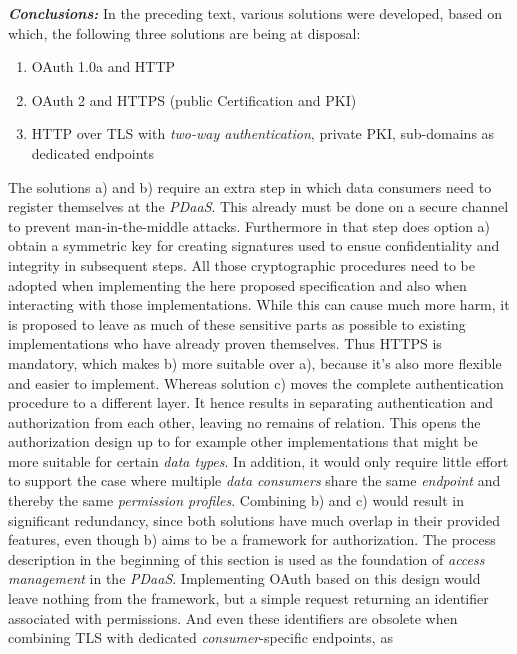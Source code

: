 \documentclass[12pt,english,a4paper,titlepage,cleardoublepage=empty,dottedtoc]{report}
\providecommand{\tightlist}{%
  \setlength{\itemsep}{0pt}\setlength{\parskip}{0pt}}
\begin{document}
\emph{\textbf{Conclusions:}} In the preceding text, various solutions
were developed, based on which, the following three solutions are being
at disposal:

\begin{enumerate}
\def\labelenumi{\alph{enumi})}
\tightlist
\item
  OAuth 1.0a and HTTP
\item
  OAuth 2 and HTTPS (public Certification and PKI)
\item
  HTTP over TLS with \emph{two-way authentication}, private PKI,
  sub-domains as dedicated endpoints
\end{enumerate}

The solutions a) and b) require an extra step in which data consumers
need to register themselves at the \emph{PDaaS}. This already must be
done on a secure channel to prevent man-in-the-middle attacks.
Furthermore in that step does option a) obtain a symmetric key for
creating signatures used to ensue confidentiality and integrity in
subsequent steps. All those cryptographic procedures need to be adopted
when implementing the here proposed specification and also when
interacting with those implementations. While this can cause much more
harm, it is proposed to leave as much of these sensitive parts as
possible to existing implementations who have already proven themselves.
Thus HTTPS is mandatory, which makes b) more suitable over a), because
it's also more flexible and easier to implement. Whereas solution c)
moves the complete authentication procedure to a different layer. It
hence results in separating authentication and authorization from each
other, leaving no remains of relation. This opens the authorization
design up to for example other implementations that might be more
suitable for certain \emph{data types}. In addition, it would only
require little effort to support the case where multiple \emph{data
consumers} share the same \emph{endpoint} and thereby the same
\emph{permission profiles}. Combining b) and c) would result in
significant redundancy, since both solutions have much overlap in their
provided features, even though b) aims to be a framework for
authorization. The process description in the beginning of this section
is used as the foundation of \emph{access management} in the
\emph{PDaaS}. Implementing OAuth based on this design would leave
nothing from the framework, but a simple request returning an identifier
associated with permissions. And even these identifiers are obsolete
when combining TLS with dedicated \emph{consumer}-specific endpoints, as
\end{document}
